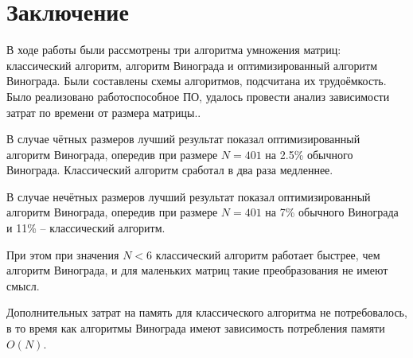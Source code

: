\chapter{Заключение}

В ходе работы были рассмотрены три алгоритма умножения матриц: классический алгоритм,
алгоритм Винограда и оптимизированный алгоритм Винограда.
Были составлены схемы алгоритмов, подсчитана их трудоёмкость.
Было реализовано работоспособное ПО, удалось провести анализ зависимости затрат по времени от размера матрицы..

В случае чётных размеров лучший результат показал оптимизированный алгоритм Винограда, опередив при размере $N=401$
на 2.5\% обычного Винограда. Классический алгоритм сработал в два раза медленнее.

В случае нечётных размеров лучший результат показал оптимизированный алгоритм Винограда, опередив при размере $N=401$
на 7\% обычного Винограда и 11\% -- классический алгоритм.

При этом при значения $N<6$ классический алгоритм работает быстрее, чем алгоритм Винограда,
и для маленьких матриц такие преобразования не имеют смысл.

Дополнительных затрат на память для классического алгоритма не потребовалось, в то время как
алгоритмы Винограда имеют зависимость потребления памяти $O(N)$.